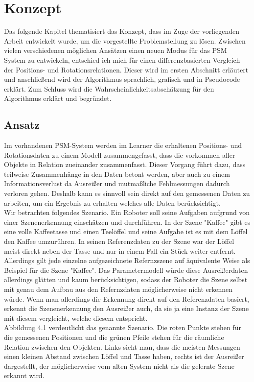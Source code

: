 \chapter{Konzept}\label{ch:konzept}
Das folgende Kapitel thematisiert das Konzept, dass im Zuge der vorliegenden Arbeit entwickelt wurde, um die vorgestellte Problemstellung zu lösen. Zwischen vielen verschiedenen möglichen Ansätzen einen neuen Modus für das PSM System zu entwickeln, entschied ich mich für einen differenzbasierten Vergleich der Positions- und Rotationsrelationen. Dieser wird im ersten Abschnitt erläutert und anschließend wird der Algorithmus sprachlich, grafisch und in Pseudocode erklärt. Zum Schluss wird die Wahrscheinlichkeitsabschätzung für den Algorithmus erklärt und begründet.
\section{Ansatz}
Im vorhandenen PSM-System werden im Learner die erhaltenen Positions- und Rotationsdaten zu einem Modell zusammengefasst, dass die vorkommen aller Objekte in Relation zueinander zusammenfasst. Dieser Vorgang führt dazu, dass teilweise Zusammenhänge in den Daten betont werden, aber auch zu einem Informationsverlust da Ausreißer und mutmaßliche Fehlmessungen dadurch verloren gehen. Deshalb kann es sinnvoll sein direkt auf den gemessenen Daten zu arbeiten, um ein Ergebnis zu erhalten welches alle Daten berücksichtigt. \smallskip\\
Wir betrachten folgendes Szenario. Ein Roboter soll seine Aufgaben aufgrund von einer Szenenerkennung einschätzen und durchführen. In der Szene "Kaffee" gibt es eine volle Kaffeetasse und einen Teelöffel und seine Aufgabe ist es mit dem Löffel den Kaffee umzurühren. In seinen Referenzdaten zu der Szene war der Löffel meist direkt neben der Tasse und nur in einem Fall ein Stück weiter entfernt. Allerdings gilt jede einzelne aufgezeichnete Refernzszene auf äquivalente Weise als Beispiel für die Szene "Kaffee". Das Parametermodell würde diese Ausreißerdaten allerdings glätten und kaum berücksichtigen, sodass der Roboter die Szene selbst mit genau dem Aufbau aus den Refernzdaten möglicherweise nicht erkennen würde. Wenn man allerdings die Erkennung direkt auf den Referenzdaten basiert, erkennt die Szenenerkennung den Ausreißer auch, da sie ja eine Instanz der Szene mit diesem vergleicht, welche diesem entspricht.\smallskip\\
Abbildung 4.1 verdeutlicht das genannte Szenario. Die roten Punkte stehen für die gemessenen Positionen und die grünen Pfeile stehen für die räumliche Relation zwischen den Objekten. Links sieht man, dass die meisten Messungen einen kleinen Abstand zwischen Löffel und Tasse haben, rechts ist der Ausreißer dargestellt, der möglicherweise vom alten System nicht als die gelernte Szene erkannt wird.\smallskip\\
